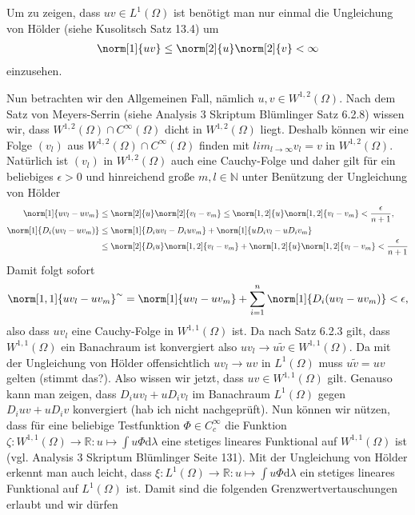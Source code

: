 \begin{solution}
    Um zu zeigen, dass $uv\in L^1(\Omega)$ ist benötigt man nur einmal die Ungleichung von Hölder (siehe Kusolitsch Satz 13.4) um 
\begin{align*}
    \norm[1]{uv}\leq\norm[2]{u}\norm[2]{v}<\infty
\end{align*}
einzusehen.

 Nun betrachten wir den Allgemeinen Fall, nämlich $u,v\in W^{1,2}(\Omega)$. Nach dem Satz von Meyers-Serrin (siehe Analysis 3 Skriptum Blümlinger Satz 6.2.8) wissen wir, dass $W^{1,2}(\Omega)\cap C^\infty(\Omega)$ dicht in $W^{1,2}(\Omega)$ liegt. Deshalb können wir eine Folge $(v_l)$ aus $W^{1,2}(\Omega)\cap C^\infty(\Omega)$ finden mit $lim_{l\to\infty}v_l=v$ in $W^{1,2}(\Omega)$. Natürlich ist $(v_l)$ in $W^{1,2}(\Omega)$ auch eine Cauchy-Folge und daher gilt für ein beliebiges $\epsilon>0$ und hinreichend große $m,l\in\mathbb{N}$ unter Benützung der Ungleichung von Hölder
\begin{align*}
    \norm[1]{uv_l-uv_m}&\leq\norm[2]{u}\norm[2]{v_l-v_m}\leq\norm[1,2]{u}\norm[1,2]{v_l-v_m}<\frac{\epsilon}{n+1},\\
    \norm[1]{D_i(uv_l-uv_m)}&\leq\norm[1]{D_iuv_l-D_iuv_m}+\norm[1]{uD_iv_l-uD_iv_m}\\
    &\leq\norm[2]{D_iu}\norm[1,2]{v_l-v_m}+\norm[1,2]{u}\norm[1,2]{v_l-v_m}<\frac{\epsilon}{n+1}
\end{align*}
Damit folgt sofort
\begin{align*}
    \norm[1,1]{uv_l-uv_m}^\sim=\norm[1]{uv_l-uv_m}+\sum_{i=1}^n\norm[1]{D_i(uv_l-uv_m)}<\epsilon,
\end{align*}
also dass $uv_l$ eine Cauchy-Folge in $W^{1,1}(\Omega)$ ist. Da nach Satz 6.2.3 gilt, dass $W^{1,1}(\Omega)$ ein Banachraum ist konvergiert also $uv_l\to u\tilde{v}\in W^{1,1}(\Omega)$. Da mit der Ungleichung von Hölder offensichtlich $uv_l\to uv$ in $L^1(\Omega)$ muss $u\tilde{v}=uv$ gelten (stimmt das?). Also wissen wir jetzt, dass $uv\in W^{1,1}(\Omega)$ gilt. Genauso kann man zeigen, dass $D_iuv_l+uD_iv_l$ im Banachraum $L^1(\Omega)$ gegen $D_iuv+uD_iv$ konvergiert (hab ich nicht nachgeprüft). Nun können wir nützen, dass für eine beliebige Testfunktion $\Phi \in C_c^\infty$ die Funktion $\zeta:W^{1,1}(\Omega)\to\mathbb{R}:u\mapsto\int u\Phi\mathrm{d}\lambda$ eine stetiges lineares Funktional auf $W^{1,1}(\Omega)$ ist (vgl. Analysis 3 Skriptum Blümlinger Seite 131). Mit der Ungleichung von Hölder erkennt man auch leicht, dass $\xi:L^1(\Omega)\to\mathbb{R}:u\mapsto\int u\Phi\mathrm{d}\lambda$ ein stetiges lineares Funktional auf $L^1(\Omega)$ ist. Damit sind die folgenden Grenzwertvertauschungen erlaubt und wir dürfen

\end{solution}
